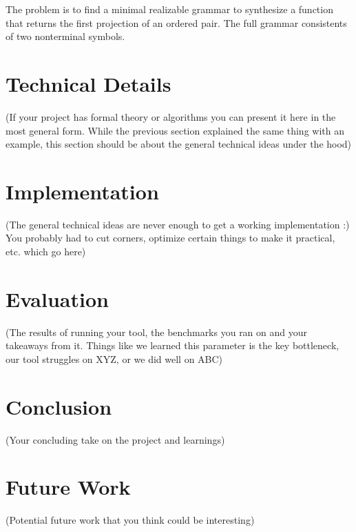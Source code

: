 \documentclass[acmsmall, nonacm]{acmart}
\begin{document}
The problem is to find a minimal realizable grammar to synthesize a function that returns the first projection of an ordered pair. The full grammar consistents of two nonterminal symbols.

\section{Technical Details}
(If your project has formal theory or algorithms you can present it here in the most general form. While the previous section explained the same thing with an example, this section should be about the general technical ideas under the hood)

\section{Implementation}
(The general technical ideas are never enough to get a working implementation :) You probably had to cut corners, optimize certain things to make it practical, etc. which go here)

\section{Evaluation}
 (The results of running your tool, the benchmarks you ran on and your takeaways from it. Things like we learned this parameter is the key bottleneck, our tool struggles on XYZ, or we did well on ABC)

\section{Conclusion}
 (Your concluding take on the project and learnings)

\section{Future Work}
 (Potential future work that you think could be interesting)







\end{document}
